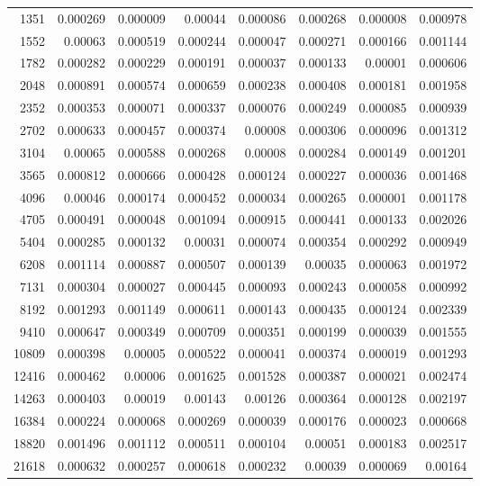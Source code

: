 \begin{longtable}{r r r r r r r r}
1351 & 0.000269 & 0.000009 & 0.00044 & 0.000086 & 0.000268 & 0.000008 & 0.000978 \\
1552 & 0.00063 & 0.000519 & 0.000244 & 0.000047 & 0.000271 & 0.000166 & 0.001144 \\
1782 & 0.000282 & 0.000229 & 0.000191 & 0.000037 & 0.000133 & 0.00001 & 0.000606 \\
2048 & 0.000891 & 0.000574 & 0.000659 & 0.000238 & 0.000408 & 0.000181 & 0.001958 \\
2352 & 0.000353 & 0.000071 & 0.000337 & 0.000076 & 0.000249 & 0.000085 & 0.000939 \\
2702 & 0.000633 & 0.000457 & 0.000374 & 0.00008 & 0.000306 & 0.000096 & 0.001312 \\
3104 & 0.00065 & 0.000588 & 0.000268 & 0.00008 & 0.000284 & 0.000149 & 0.001201 \\
3565 & 0.000812 & 0.000666 & 0.000428 & 0.000124 & 0.000227 & 0.000036 & 0.001468 \\
4096 & 0.00046 & 0.000174 & 0.000452 & 0.000034 & 0.000265 & 0.000001 & 0.001178 \\
4705 & 0.000491 & 0.000048 & 0.001094 & 0.000915 & 0.000441 & 0.000133 & 0.002026 \\
5404 & 0.000285 & 0.000132 & 0.00031 & 0.000074 & 0.000354 & 0.000292 & 0.000949 \\
6208 & 0.001114 & 0.000887 & 0.000507 & 0.000139 & 0.00035 & 0.000063 & 0.001972 \\
7131 & 0.000304 & 0.000027 & 0.000445 & 0.000093 & 0.000243 & 0.000058 & 0.000992 \\
8192 & 0.001293 & 0.001149 & 0.000611 & 0.000143 & 0.000435 & 0.000124 & 0.002339 \\
9410 & 0.000647 & 0.000349 & 0.000709 & 0.000351 & 0.000199 & 0.000039 & 0.001555 \\
10809 & 0.000398 & 0.00005 & 0.000522 & 0.000041 & 0.000374 & 0.000019 & 0.001293 \\
12416 & 0.000462 & 0.00006 & 0.001625 & 0.001528 & 0.000387 & 0.000021 & 0.002474 \\
14263 & 0.000403 & 0.00019 & 0.00143 & 0.00126 & 0.000364 & 0.000128 & 0.002197 \\
16384 & 0.000224 & 0.000068 & 0.000269 & 0.000039 & 0.000176 & 0.000023 & 0.000668 \\
18820 & 0.001496 & 0.001112 & 0.000511 & 0.000104 & 0.00051 & 0.000183 & 0.002517 \\
21618 & 0.000632 & 0.000257 & 0.000618 & 0.000232 & 0.00039 & 0.000069 & 0.00164 \\

\end{longtable}
